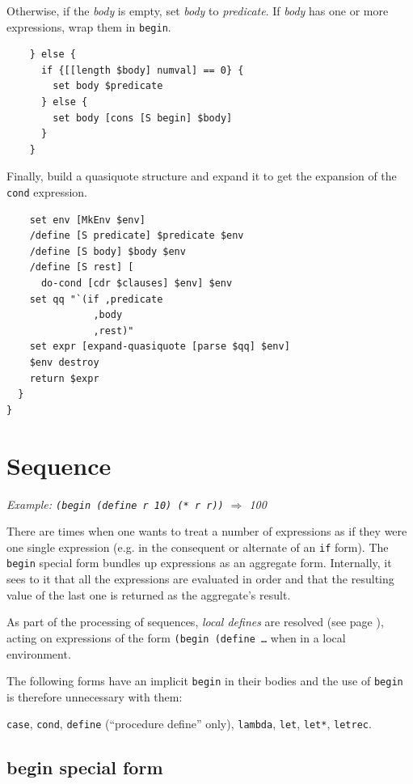 \documentclass[a5paper,draft]{memoir}
\begin{document}
Otherwise, if the \emph{body} is empty, set \emph{body} to \emph{predicate}. If \emph{body} has one or more expressions, wrap them in \texttt{begin}.

\begin{lstlisting}
    } else {
      if {[[length $body] numval] == 0} {
        set body $predicate
      } else {
        set body [cons [S begin] $body]
      }
    }
\end{lstlisting}

Finally, build a quasiquote structure and expand it to get the expansion of the \texttt{cond} expression.

\begin{lstlisting}
    set env [MkEnv $env]
    /define [S predicate] $predicate $env
    /define [S body] $body $env
    /define [S rest] [
      do-cond [cdr $clauses] $env] $env
    set qq "`(if ,predicate
               ,body
               ,rest)"
    set expr [expand-quasiquote [parse $qq] $env]
    $env destroy
    return $expr
  }
}
\end{lstlisting}

\section{Sequence}
\label{sequence}

\emph{Example: \texttt{(begin (define r 10) (* r r))} $\Rightarrow$ 100}

There are times when one wants to treat a number of expressions as if they were one single expression (e.g. in the consequent or alternate of an \texttt{if} form). The \texttt{begin} special form bundles up expressions as an aggregate form. Internally, it sees to it that all the expressions are evaluated in order and that the resulting value of the last one is returned as the aggregate's result.

As part of the processing of sequences, \emph{local defines} are resolved (see page \pageref{resolving-local-defines}), acting on expressions of the form \texttt{(begin (define \ldots } when in a local environment.

The following forms have an implicit \texttt{begin} in their bodies and the use of \texttt{begin} is therefore unnecessary with them:

\texttt{case}, \texttt{cond}, \texttt{define} (“procedure define” only), \texttt{lambda}, \texttt{let}, \texttt{let*}, \texttt{letrec}.

\subsection{begin special form}
\label{begin-special-form}
\end{document}
